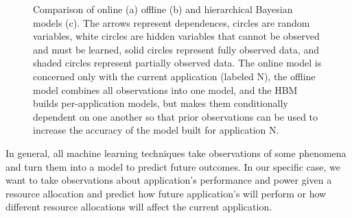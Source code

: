 \begin{figure}

  \caption{ Comparison of online (a) offline (b) and hierarchical
    Bayesian models (c).  The arrows represent dependences, circles
    are random variables, white circles are hidden variables that
    cannot be observed and must be learned, solid circles represent
    fully observed data, and shaded circles represent partially
    observed data.  The online model is concerned only with the
    current application (labeled N), the offline model combines all
    observations into one model, and the HBM builds per-application
    models, but makes them conditionally dependent on one another so
    that prior observations can be used to increase the accuracy of
    the model built for application N.}
\label{fig:learning-models}
\end{figure}

In general, all machine learning techniques take observations of some
phenomena and turn them into a model to predict future outcomes.  In
our specific case, we want to take observations about application's
performance and power given a resource allocation and predict how
future application's will perform or how different resource
allocations will affect the current application.  

